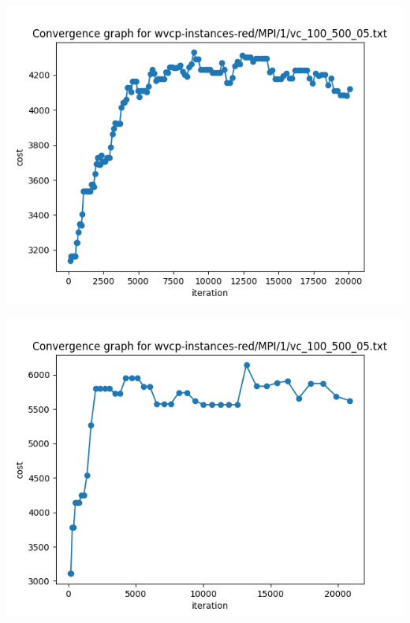\documentclass[11pt]{article}
\begin{document}
\begin{center}
\begin{minipage}{0.48\linewidth}
\includegraphics[width=\linewidth]{conv_graph_vc_100_500_05_rand_A.png}
\end{minipage}%
\begin{minipage}{0.49\linewidth}
\includegraphics[width=\linewidth]{conv_graph_vc_100_500_05_rand_B.png}
\end{minipage}
\begin{minipage}{0.49\linewidth}

\end{minipage}
\end{center}
\end{document}
